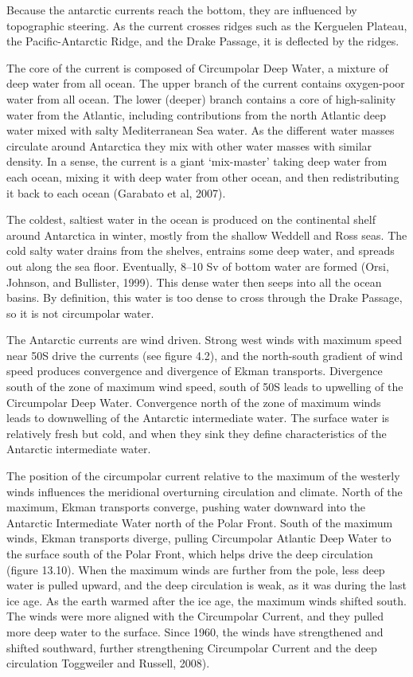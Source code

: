 Because the antarctic currents reach the bottom, they are influenced
by topographic steering. As the current crosses ridges such as the
Kerguelen Plateau, the Pacific-Antarctic Ridge, and the Drake Passage,
it is deflected by the ridges.

The core of the current is composed of Circumpolar Deep
Water, a mixture of deep
water from all ocean. The upper branch of the current contains
oxygen-poor water from all ocean. The lower (deeper) branch contains a
core of high-salinity water from the Atlantic, including contributions
from the north Atlantic deep water mixed with salty Mediterranean Sea
water. As the different water masses circulate around Antarctica they
mix with other water masses with similar density. In a sense, the
current is a giant `mix-master' taking deep water from each ocean,
mixing it with deep water from
other ocean, and then redistributing it back to each ocean (Garabato
et al, 2007).

The coldest, saltiest water in the ocean is produced on the
continental shelf around Antarctica in winter, mostly from the shallow
Weddell and Ross seas. The cold salty water drains from the shelves,
entrains some deep water, and spreads out along the sea
floor. Eventually, 8--10 Sv of bottom water are formed (Orsi, Johnson,
and Bullister, 1999). This dense water then seeps into all the ocean
basins. By definition, this water is too dense to cross through the
Drake Passage, so it is not circumpolar water.

The Antarctic currents are wind driven. Strong west winds with maximum
speed near 50\degrees S drive the currents (see figure 4.2), and the
north-south gradient of wind speed produces convergence and divergence
of Ekman transports. Divergence south of the
zone of maximum wind speed, south of 50\degrees S leads to
upwelling of the
Circumpolar Deep Water. Convergence north of the zone of maximum winds
leads to downwelling of the Antarctic intermediate water. The surface
water is relatively fresh but cold, and when they sink they define
characteristics of the Antarctic intermediate water.

The position of the circumpolar current relative to the maximum of the
westerly winds influences the meridional overturning circulation and
climate. North of the maximum, Ekman transports converge, pushing water downward into the Antarctic Intermediate
Water north of the Polar Front. South of
the maximum winds, Ekman transports diverge, pulling Circumpolar
Atlantic Deep Water to the surface south of the Polar Front, which
helps drive the deep circulation (figure 13.10). When the maximum
winds are further from the pole, less deep water is pulled upward, and
the deep circulation is weak, as it was during the last ice age. As
the earth warmed after the ice age, the maximum winds shifted
south. The winds were more aligned with the Circumpolar Current, and
they pulled more deep water to the surface. Since 1960, the winds have
strengthened and shifted southward, further strengthening Circumpolar
Current and the deep circulation Toggweiler and Russell, 2008).

